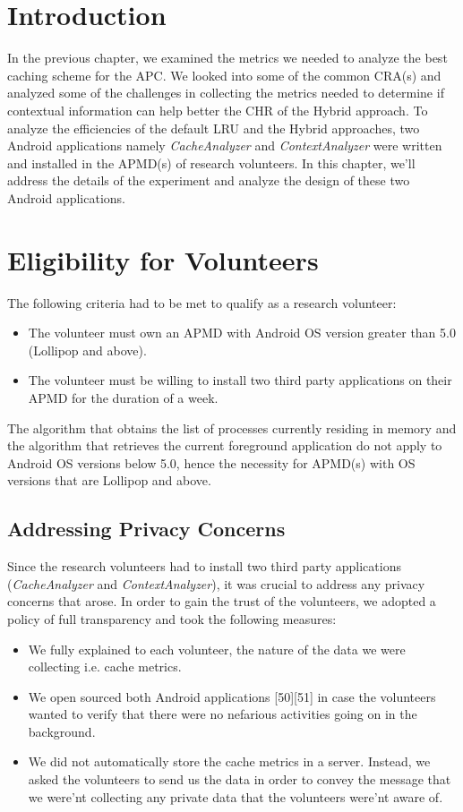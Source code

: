 \documentclass[12pt]{uthesis-v12}  %
\begin{document}
	\section{Introduction}
		In the previous chapter, we examined the metrics we needed to analyze the best caching scheme for the APC. We looked into some of the common CRA(s) and analyzed some of the challenges in collecting the metrics needed to determine if contextual information can help better the CHR of the Hybrid approach. To analyze the efficiencies of the default LRU and the Hybrid approaches, two Android applications namely {\em CacheAnalyzer} and {\em ContextAnalyzer} were written and installed in the APMD(s) of research volunteers. In this chapter, we'll address the details of the experiment and analyze the design of these two Android applications. 
		
	\section{Eligibility for Volunteers}
		The following criteria had to be met to qualify as a research volunteer:
		
		\begin{itemize}
			\item The volunteer must own an APMD with Android OS version greater than 5.0 (Lollipop and above).
			\item The volunteer must be willing to install two third party applications on their APMD for the duration of a week.
		\end{itemize}
		
		The algorithm that obtains the list of processes currently residing in memory and the algorithm that retrieves the current foreground application do not apply to Android OS versions below 5.0, hence the necessity for APMD(s) with OS versions that are Lollipop and above.
		
		\subsection{Addressing Privacy Concerns}
			Since the research volunteers had to install two third party applications ({\em CacheAnalyzer} and {\em ContextAnalyzer}), it was crucial to address any privacy concerns that arose. In order to gain the trust of the volunteers, we adopted a policy of full transparency and took the following measures:
			
			\begin{itemize}
				\item We fully explained to each volunteer, the nature of the data we were collecting i.e. cache metrics.
				\item We open sourced both Android applications [50][51] in case the volunteers wanted to verify that there were no nefarious activities going on in the background.
				\item We did not automatically store the cache metrics in a server. Instead, we asked the volunteers to send us the data in order to convey the message that we were'nt collecting any private data that the volunteers were'nt aware of.
			\end{itemize}
			
\end{document}
